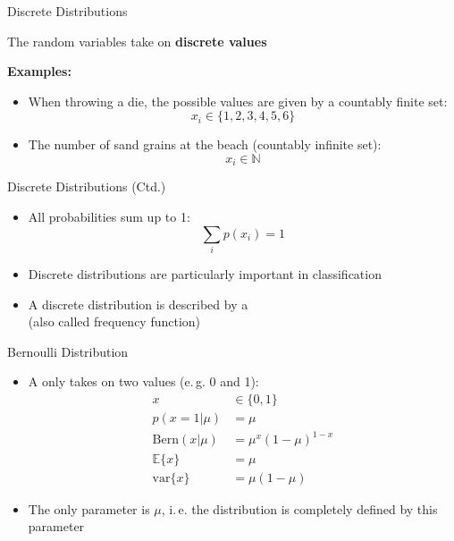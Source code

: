\begin{frame}{Discrete Distributions}{}
	\begin{boxBlueNoFrame}
		The random variables take on \textbf{discrete values}
	\end{boxBlueNoFrame}

	\textbf{Examples:}
	\begin{itemize}
		\item When throwing a die, the possible values are given by a countably finite set:
		\begin{equation*}
			x_i \in \{ 1, 2, 3, 4, 5, 6 \}
		\end{equation*}
		\item The number of sand grains at the beach (countably infinite set):
		\begin{equation*}
			x_i \in \mathbb{N}
		\end{equation*}
	\end{itemize}
\end{frame}


\begin{frame}{Discrete Distributions (Ctd.)}{}
	\begin{itemize}
		\item All probabilities sum up to 1:
		\begin{equation*}
			\sum_i p(x_i) = 1
		\end{equation*}
		\item Discrete distributions are particularly important in classification
		\item A discrete distribution is described by a  \\
			(also called frequency function)
	\end{itemize}
\end{frame}


\begin{frame}{Bernoulli Distribution}{}
	\begin{itemize}
		\item A  only takes on two values (e.\,g. 0 and 1):
		\begin{align}
			x
				&\in \{ 0, 1 \} 				\\
			p(x = 1 \vert \mu)
				&= \mu 					\\
			\text{Bern}(x \vert \mu)
				&= \mu^x (1 - \mu)^{1 - x} 	\\
			\mathbb{E}\{ x \}
				&= \mu 					\\
			\text{var}\{ x \}
				&= \mu (1 - \mu)
		\end{align}
		\item The only parameter is $\mu$, i.\,e. the distribution is completely defined by this parameter
	\end{itemize}
\end{frame}


